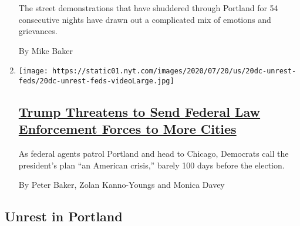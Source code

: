 \begin{enumerate}
  The street demonstrations that have shuddered through Portland for 54
  consecutive nights have drawn out a complicated mix of emotions and
  grievances.

  By Mike Baker
\item
  \texttt{[image: https://static01.nyt.com/images/2020/07/20/us/20dc-unrest-feds/20dc-unrest-feds-videoLarge.jpg]}

  \hypertarget{trump-threatens-to-send-federal-law-enforcement-forces-to-more-cities}{%
  \subsection{\texorpdfstring{\href{/2020/07/20/us/politics/trump-chicago-portland-federal-agents.html}{Trump
  Threatens to Send Federal Law Enforcement Forces to More
  Cities}}{Trump Threatens to Send Federal Law Enforcement Forces to More Cities}}\label{trump-threatens-to-send-federal-law-enforcement-forces-to-more-cities}}

  As federal agents patrol Portland and head to Chicago, Democrats call
  the president's plan ``an American crisis,'' barely 100 days before
  the election.

  By Peter Baker, Zolan Kanno-Youngs and Monica Davey
\end{enumerate}

\hypertarget{unrest-in-portland}{%
\subsection{Unrest in Portland}\label{unrest-in-portland}}

